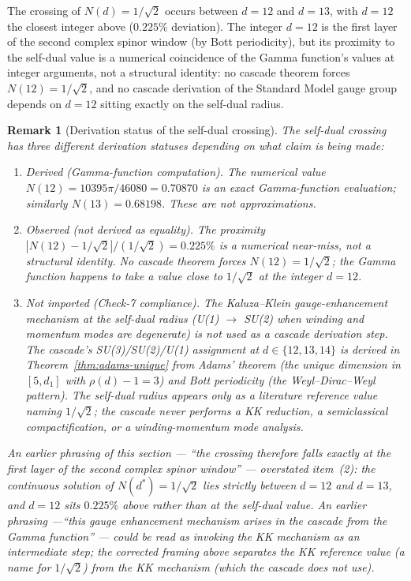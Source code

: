 \documentclass[12pt,a4paper]{article}
\newtheorem{remark}[theorem]{Remark}
\begin{document}
The crossing of $N(d) = 1/\sqrt{2}$ occurs between $d=12$ and $d=13$,
with $d=12$ the closest integer above ($0.225\%$ deviation). The
integer $d=12$ is the first layer of the second complex spinor window
(by Bott periodicity), but its proximity to the self-dual value is a
numerical coincidence of the Gamma function's values at integer
arguments, not a structural identity: no cascade theorem forces
$N(12) = 1/\sqrt{2}$, and no cascade derivation of the Standard Model
gauge group depends on $d=12$ sitting exactly on the self-dual radius.

\begin{remark}[Derivation status of the self-dual crossing]\label{rem:sp27-status}
The self-dual crossing has three different derivation statuses
depending on what claim is being made:
\begin{enumerate}
\item \emph{Derived (Gamma-function computation).} The numerical value
$N(12) = 10395\pi/46080 = 0.70870$ is an exact Gamma-function
evaluation; similarly $N(13) = 0.68198$. These are not approximations.
\item \emph{Observed (not derived as equality).} The proximity
$|N(12) - 1/\sqrt{2}|/(1/\sqrt{2}) = 0.225\%$ is a numerical
near-miss, not a structural identity. No cascade theorem forces
$N(12) = 1/\sqrt{2}$; the Gamma function happens to take a value
close to $1/\sqrt{2}$ at the integer $d=12$.
\item \emph{Not imported (Check-7 compliance).} The Kaluza--Klein
gauge-enhancement mechanism at the self-dual radius (U(1)
$\to$ SU(2) when winding and momentum modes are degenerate) is
\emph{not} used as a cascade derivation step. The cascade's
SU(3)/SU(2)/U(1) assignment at $d\in\{12,13,14\}$ is derived in
Theorem~\ref{thm:adams-unique} from Adams' theorem (the unique
dimension in $[5,d_1]$ with $\rho(d)-1 = 3$) and Bott periodicity
(the Weyl--Dirac--Weyl pattern). The self-dual radius appears only
as a literature reference value naming $1/\sqrt{2}$; the cascade
never performs a KK reduction, a semiclassical compactification, or
a winding-momentum mode analysis.
\end{enumerate}
An earlier phrasing of this section --- ``the crossing therefore falls
exactly at the first layer of the second complex spinor window'' ---
overstated item~(2): the continuous solution of $N(d^*) = 1/\sqrt{2}$
lies strictly between $d=12$ and $d=13$, and $d=12$ sits $0.225\%$
above rather than \emph{at} the self-dual value. An earlier phrasing
---``this gauge enhancement mechanism arises in the cascade from the
Gamma function'' --- could be read as invoking the KK mechanism as an
intermediate step; the corrected framing above separates the KK
reference value (a \emph{name} for $1/\sqrt{2}$) from the KK mechanism
(which the cascade does not use).
\end{remark}
\end{document}
